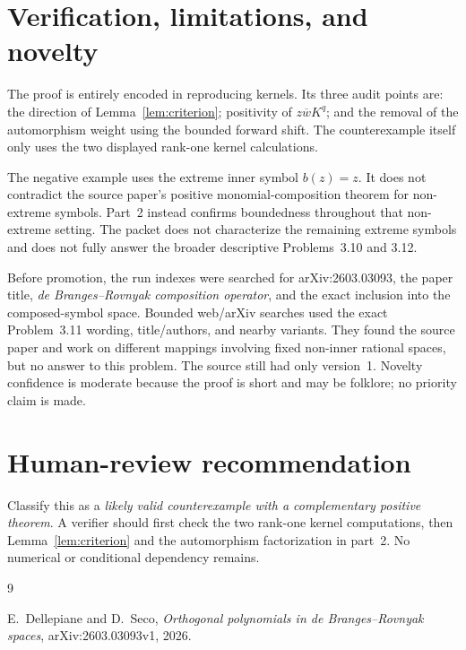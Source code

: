 \documentclass[11pt]{article}
\theoremstyle{remark}
\begin{document}
\section{Verification, limitations, and novelty}

The proof is entirely encoded in reproducing kernels. Its three audit points
are: the direction of Lemma~\ref{lem:criterion}; positivity of
\(z\overline wK^q\); and the removal of the automorphism weight using the
bounded forward shift. The counterexample itself only uses the two displayed
rank-one kernel calculations.

The negative example uses the extreme inner symbol \(b(z)=z\). It does not
contradict the source paper's positive monomial-composition theorem for
non-extreme symbols. Part~2 instead confirms boundedness throughout that
non-extreme setting. The packet does not characterize the remaining extreme
symbols and does not fully answer the broader descriptive Problems~3.10 and
3.12.

Before promotion, the run indexes were searched for arXiv:2603.03093, the
paper title, \emph{de Branges--Rovnyak composition operator}, and the exact
inclusion into the composed-symbol space. Bounded web/arXiv searches used the exact
Problem~3.11 wording, title/authors, and nearby variants. They found the source
paper and work on different mappings involving fixed non-inner rational
spaces, but no answer to this problem. The source still had only version~1.
Novelty confidence is moderate because the proof is short and may be folklore;
no priority claim is made.

\section{Human-review recommendation}

Classify this as a \emph{likely valid counterexample with a complementary
positive theorem}. A verifier should first check the two rank-one kernel
computations, then Lemma~\ref{lem:criterion} and the automorphism factorization
in part~2. No numerical or conditional dependency remains.

\begin{thebibliography}{9}

E.~Dellepiane and D.~Seco,
\emph{Orthogonal polynomials in de Branges--Rovnyak spaces},
arXiv:2603.03093v1, 2026.

\end{thebibliography}
\end{document}
